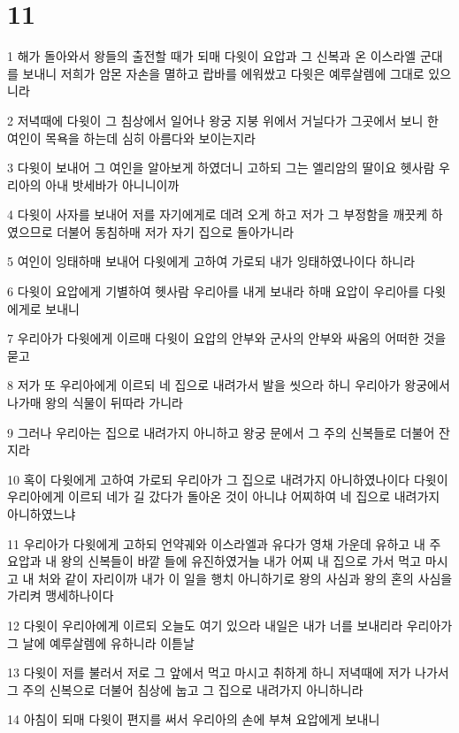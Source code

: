 \chapter{11}

\par 1 해가 돌아와서 왕들의 출전할 때가 되매 다윗이 요압과 그 신복과 온 이스라엘 군대를 보내니 저희가 암몬 자손을 멸하고 랍바를 에워쌌고 다윗은 예루살렘에 그대로 있으니라
\par 2 저녁때에 다윗이 그 침상에서 일어나 왕궁 지붕 위에서 거닐다가 그곳에서 보니 한 여인이 목욕을 하는데 심히 아름다와 보이는지라
\par 3 다윗이 보내어 그 여인을 알아보게 하였더니 고하되 그는 엘리암의 딸이요 헷사람 우리아의 아내 밧세바가 아니니이까
\par 4 다윗이 사자를 보내어 저를 자기에게로 데려 오게 하고 저가 그 부정함을 깨끗케 하였으므로 더불어 동침하매 저가 자기 집으로 돌아가니라
\par 5 여인이 잉태하매 보내어 다윗에게 고하여 가로되 내가 잉태하였나이다 하니라
\par 6 다윗이 요압에게 기별하여 헷사람 우리아를 내게 보내라 하매 요압이 우리아를 다윗에게로 보내니
\par 7 우리아가 다윗에게 이르매 다윗이 요압의 안부와 군사의 안부와 싸움의 어떠한 것을 묻고
\par 8 저가 또 우리아에게 이르되 네 집으로 내려가서 발을 씻으라 하니 우리아가 왕궁에서 나가매 왕의 식물이 뒤따라 가니라
\par 9 그러나 우리아는 집으로 내려가지 아니하고 왕궁 문에서 그 주의 신복들로 더불어 잔지라
\par 10 혹이 다윗에게 고하여 가로되 우리아가 그 집으로 내려가지 아니하였나이다 다윗이 우리아에게 이르되 네가 길 갔다가 돌아온 것이 아니냐 어찌하여 네 집으로 내려가지 아니하였느냐
\par 11 우리아가 다윗에게 고하되 언약궤와 이스라엘과 유다가 영채 가운데 유하고 내 주 요압과 내 왕의 신복들이 바깥 들에 유진하였거늘 내가 어찌 내 집으로 가서 먹고 마시고 내 처와 같이 자리이까 내가 이 일을 행치 아니하기로 왕의 사심과 왕의 혼의 사심을 가리켜 맹세하나이다
\par 12 다윗이 우리아에게 이르되 오늘도 여기 있으라 내일은 내가 너를 보내리라 우리아가 그 날에 예루살렘에 유하니라 이튿날
\par 13 다윗이 저를 불러서 저로 그 앞에서 먹고 마시고 취하게 하니 저녁때에 저가 나가서 그 주의 신복으로 더불어 침상에 눕고 그 집으로 내려가지 아니하니라
\par 14 아침이 되매 다윗이 편지를 써서 우리아의 손에 부쳐 요압에게 보내니
